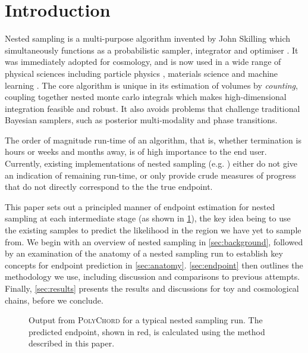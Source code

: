 \documentclass[usenatbib]{mnras}
\begin{document}
\section{Introduction}
Nested sampling is a multi-purpose algorithm invented by John Skilling which simultaneously functions as a probabilistic sampler, integrator and optimiser \citep{skilling}. It was immediately adopted for cosmology, and is now used in a wide range of physical sciences including particle physics \citep{Trotta_2008}, materials science \citep{materials} and machine learning \citep{sparse_reconstruction}. The core algorithm is unique in its estimation of volumes by \textit{counting}, coupling together nested monte carlo integrals which makes high-dimensional integration feasible and robust. It also avoids problems that challenge traditional Bayesian samplers, such as posterior multi-modality and phase transitions.
\par
The order of magnitude run-time of an algorithm, that is, whether termination is hours or weeks and months away, is of high importance to the end user. Currently, existing implementations of nested sampling (e.g. \citealt{multinest, polychord, dnest, dynesty, ultranest, nessai,proxnest}) either do not give an indication of remaining run-time, or only provide crude measures of progress that do not directly correspond to the the true endpoint.
\par
This paper sets out a principled manner of endpoint estimation for nested sampling at each intermediate stage (as shown in \cref{fig:polychord_output}), the key idea being to use the existing samples to predict the likelihood in the region we have yet to sample from. We begin with an overview of nested sampling in \cref{sec:background}, followed by an examination of the anatomy of a nested sampling run to establish key concepts for endpoint prediction in \cref{sec:anatomy}. \cref{sec:endpoint} then outlines the methodology we use, including discussion and comparisons to previous attempts. Finally, \cref{sec:results} presents the results and discussions for toy and cosmological chains, before we conclude.
\begin{figure}
\caption{Output from \textsc{PolyChord} for a typical nested sampling run. The predicted endpoint, shown in red, is calculated using the method described in this paper.}
\label{fig:polychord_output}
\end{figure}
\end{document}
